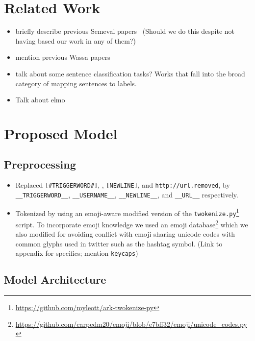\documentclass[11pt,a4paper]{article}
\begin{document}
\section{Related Work}
\begin{itemize}
    \item briefly describe previous Semeval papers~\cite{baziotis2018ntua,
        duppada2018seernet, abdou2018affecthor} (Should we do this despite not
        having based our work in any of them?)
    \item mention previous Wassa papers
    \item talk about some sentence classification tasks? Works that fall into
        the broad category of mapping sentences to labels.
    \item Talk about elmo~\cite{peters2018deep}
\end{itemize}

\section{Proposed Model}
\subsection{Preprocessing}
\begin{itemize}
    \item Replaced \texttt{\footnotesize[\#TRIGGERWORD\#]}, \texttt{\footnotesize@USERNAME},
        \texttt{\footnotesize[NEWLINE]}, and \texttt{\footnotesize http://url.removed}, by
        \texttt{\footnotesize\_\_TRIGGERWORD\_\_}, \texttt{\footnotesize\_\_USERNAME\_\_},
        \texttt{\footnotesize\_\_NEWLINE\_\_}, and
        \texttt{\footnotesize\_\_URL\_\_} respectively.
    \item Tokenized by using an emoji-aware modified version of the
        \texttt{twokenize.py}\footnote{\tiny\url{https://github.com/myleott/ark-twokenize-py}}
        script. To incorporate emoji knowledge we used an emoji
        database\footnote{\tiny\url{https://github.com/carpedm20/emoji/blob/e7bff32/emoji/unicode_codes.py}}
        which we also modified for avoiding conflict with emoji sharing unicode
        codes with common glyphs used in twitter such as the hashtag symbol.
        (Link to appendix for specifics; mention \texttt{keycaps})
\end{itemize}


\subsection{Model Architecture}
\end{document}
